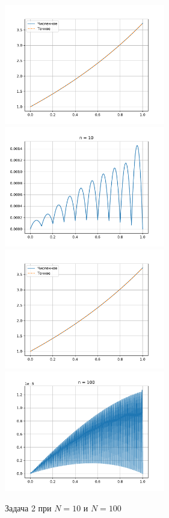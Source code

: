 \begin{figure}[H]
    \centering
    \includegraphics[width=7cm]{pictures/plot2_10.pdf}
    \includegraphics[width=7cm]{pictures/diff2_10.pdf}
    \includegraphics[width=7cm]{pictures/plot2_100.pdf}
    \includegraphics[width=7cm]{pictures/diff2_100.pdf}
    \caption{Задача 2 при \(N = 10\) и \(N = 100\)}\label{z2p}
\end{figure}

